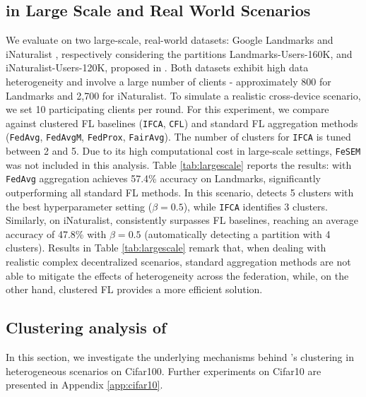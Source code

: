 \subsection{\shortname in Large Scale and Real World Scenarios}\label{sec:large_scale}

We evaluate \shortname on two large-scale, real-world datasets: Google Landmarks \citep{weyand2020google} and iNaturalist \citep{van2018inaturalist}, respectively considering the partitions Landmarks-Users-160K, and iNaturalist-Users-120K, proposed in \citep{hsu2020federated}. Both datasets exhibit high data heterogeneity and involve a large number of clients - approximately 800 for Landmarks and 2,700 for iNaturalist. To simulate a realistic cross-device scenario, we set 10 participating clients per round.
For this experiment, we compare \shortname against clustered FL baselines (\texttt{IFCA}, \texttt{CFL}) and standard FL aggregation methods (\texttt{FedAvg}, \texttt{FedAvgM}, \texttt{FedProx}, \texttt{FairAvg}). The number of clusters for \texttt{IFCA} is tuned between 2 and 5. Due to its high computational cost in large-scale settings, \texttt{FeSEM} was not included in this analysis.
Table \ref{tab:largescale} reports the results: \shortname with \texttt{FedAvg} aggregation achieves 57.4\% accuracy on Landmarks, significantly outperforming all standard FL methods. In this scenario, \shortname detects 5 clusters with the best hyperparameter setting ($\beta = 0.5$), while \texttt{IFCA} identifies 3 clusters.
Similarly, on iNaturalist, \shortname consistently surpasses FL baselines, reaching an average accuracy of 47.8\% with $\beta = 0.5$ (automatically detecting a partition with 4 clusters). Results in Table \ref{tab:largescale} remark that, when dealing with realistic complex decentralized scenarios, standard aggregation methods are not able to mitigate the effects of heterogeneity across the federation, while, on the other hand, clustered FL provides a more efficient solution.
\vspace{-1em}
\subsection{Clustering analysis of \shortname}\label{sect:ablation}
In this section, we investigate the underlying mechanisms behind \shortname’s clustering in heterogeneous scenarios on Cifar100. Further experiments on Cifar10 are presented in Appendix \ref{app:cifar10}.
\vspace{-1.3em}
